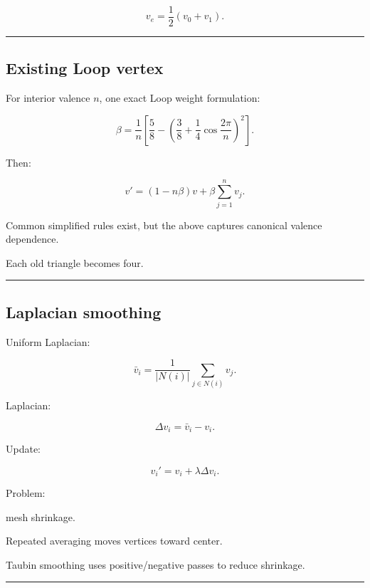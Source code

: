 \[
v_e=
\frac12(v_0+v_1).
\]

\begin{center}\rule{0.5\linewidth}{0.5pt}\end{center}

\subsection{Existing Loop vertex}\label{04-visual-computing-ii-ch041-existing-loop-vertex}

\hypertarget{04-visual-computing-ii-ch041-existing-loop-vertex}{}

For interior valence \(n\), one exact Loop weight formulation:

\[
\beta
=
\frac1n
\left[
\frac58-
\left(
\frac38+
\frac14\cos\frac{2\pi}{n}
\right)^2
\right].
\]

Then:

\[
\boxed{
v'
=
(1-n\beta)v
+
\beta
\sum_{j=1}^{n}v_j.
}
\]

Common simplified rules exist, but the above captures canonical valence dependence.

Each old triangle becomes four.

\begin{center}\rule{0.5\linewidth}{0.5pt}\end{center}

\subsection{Laplacian smoothing}\label{04-visual-computing-ii-ch041-laplacian-smoothing}

\hypertarget{04-visual-computing-ii-ch041-laplacian-smoothing}{}

Uniform Laplacian:

\[
\bar v_i=
\frac1{|N(i)|}
\sum_{j\in N(i)}
v_j.
\]

Laplacian:

\[
\Delta v_i=
\bar v_i-v_i.
\]

Update:

\[
\boxed{
v_i'
=
v_i+
\lambda\Delta v_i.
}
\]

Problem:

mesh shrinkage.

Repeated averaging moves vertices toward center.

Taubin smoothing uses positive/negative passes to reduce shrinkage.

\begin{center}\rule{0.5\linewidth}{0.5pt}\end{center}

